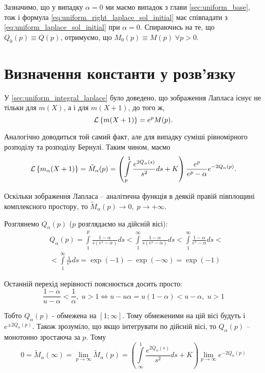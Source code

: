 Зазначимо, що у випадку $\alpha=0$ ми маємо випадок з глави \ref{sec:uniform_base}, тож і формула \eqref{eq:uniform_right_laplace_sol_initial} має співпадати з \eqref{eq:uniform_laplace_sol_initial} при $\alpha = 0$. Спираючись на те, що $Q_0(p) \equiv Q(p)$, отримуємо, що $M_0(p) \equiv M(p) \; \forall p > 0$.

\section{Визначення константи у розв'язку}

У \ref{sec:uniform_integral_laplace} було доведено, що зображення Лапласа існує не тільки для $m(X)$, а і для $m(X+1)$, до того ж,
\begin{equation}
	\mathcal{L}\left\{m(X+1)\right\} = e^p M(p).
\end{equation}

Аналогічно доводиться той самий факт, але для випадку суміші рівномірного розподілу та розподілу Бернулі. Таким чином, маємо
\begin{equation}
	\mathcal{L}\left\{m_\alpha(X+1)\right\} =\tilde M_\alpha(p)= \left( \int\limits_p^1 \frac{e^{2Q_\alpha(s)}}{s^2} ds + K \right) \frac{e^p}{e^p - \alpha} e^{- 2Q_\alpha(p)}.
\end{equation}

Оскільки зображення Лапласа – аналітична функція в деякій правій півплощині комплексного простору, то $\tilde M_\alpha(p) \rightarrow 0,\; p \rightarrow +\infty$.

Розглянемо $Q_\alpha(p)$ ($p$ розглядаємо на дійсній вісі):
\begin{equation}
\begin{split}
	\label{eq:q_alpha_p_major}
	&Q_\alpha(p) = \int\limits_1^p \frac{1-\alpha}{s(e^s - \alpha)} ds <  \int\limits_1^\infty \frac{1 - \alpha}{s(e^s - \alpha)} ds < 
	\int\limits_1^\infty \frac{1- \alpha}{e^s - \alpha} ds<\\
	&< \int\limits_1^\infty \frac{1}{e^s} ds = \exp(-1) - \exp(-\infty) = \exp(-1)
\end{split}
\end{equation}

Останній перехід нерівності пояснюється досить просто:
$$
\frac{1-\alpha}{u - \alpha} < \frac{1}{\alpha}, \; u > 1 \Leftrightarrow u - u \alpha = u(1-\alpha) < u - \alpha, \; u > 1
$$

Тобто $Q_\alpha(p)$ - обмежена на $[1; \infty]$. Тому обмеженими на цій вісі будуть і $e^{\pm 2Q_\alpha(p)}$. Також зрозуміло, що якщо інтегрувати по дійсній вісі, то $Q_\alpha(p)$ – монотонно зростаюча за $p$. Тому
\begin{equation}
	0 = \tilde M_\alpha(\infty) = \lim_{p\rightarrow \infty} \tilde M_\alpha(p) = \left( \int\limits_\infty^1 \frac{e^{2Q_\alpha(s)}}{s^2} ds + K \right) \lim_{p\rightarrow \infty} e^{- 2Q_\alpha(p)}
\end{equation}

